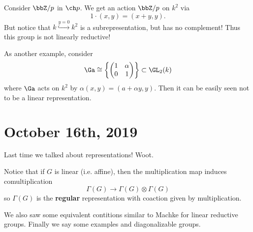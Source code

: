 \documentclass[12pt]{article}
\begin{document}
Consider $\bbZ/p$ in $\ch p$. We get an action $\bbZ/p$ on $k^2$ via 
\[1\cdot(x,y)=(x+y,y).\]
But notice that $k\stackrel{y=0}{\hookrightarrow}k^2$ is a subrepresentation, but has no complement! Thus this group is not linearly reductive!

\brk

As another example, consider
\[\Ga\cong\left\{\begin{pmatrix}
	1 & \alpha \\ 0 & 1
\end{pmatrix}\right\}
\subset\GL_2(k)\]
where $\Ga$ acts on $k^2$ by $\alpha(x,y)=(a+\alpha y,y)$. Then it can be easily seen not to be a linear representation.

\section{October 16th, 2019}
Last time we talked about representations! Woot.

Notice that if $G$ is linear (i.e. affine), then the multiplication map induces comultiplication 
\[\Gamma(G)\to \Gamma(G)\otimes\Gamma(G)\]
so $\Gamma(G)$ is the \textbf{regular} representation with coaction given by multiplication.

We also saw some equivalent contitions similar to Machke for linear reductive groups. Finally we say some examples and diagonalizable groups.
\end{document}
